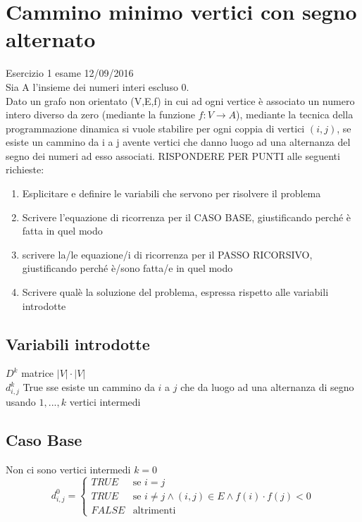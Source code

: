 \documentclass[12pt, a4paper, openany]{book}
\begin{document}
\section{Cammino minimo vertici con segno alternato} Esercizio 1 esame 12/09/2016\\
Sia A l'insieme dei numeri interi escluso 0.\\
Dato un grafo non orientato (V,E,f) in cui ad ogni vertice è associato un numero intero
diverso da zero (mediante la funzione $f: V\rightarrow A$), mediante la tecnica della
programmazione dinamica si vuole stabilire per ogni coppia di vertici $(i,j)$, se esiste un
cammino da i a j avente vertici che danno luogo ad una alternanza del segno dei numeri
ad esso associati. RISPONDERE PER PUNTI alle seguenti richieste:
\begin{enumerate}
	\item Esplicitare e definire le variabili che servono per risolvere il problema
	\item Scrivere l'equazione di ricorrenza per il CASO BASE, giustificando perché è fatta in quel modo
	\item scrivere la/le equazione/i di ricorrenza per il PASSO RICORSIVO, giustificando perché è/sono fatta/e in quel modo
	\item Scrivere qualè la soluzione del problema, espressa rispetto alle variabili introdotte
\end{enumerate}

\subsection*{Variabili introdotte}
$D^k$ matrice $|V|\cdot|V|$
\\$d^k_{i,j}$ True sse esiste un cammino da $i$ a $j$ che da luogo ad una alternanza di segno usando ${1,...,k}$ vertici intermedi

	\subsection*{Caso Base} Non ci sono vertici intermedi $k=0$
	\begin{equation*}
		d^0_{i,j} = \begin{cases}
			TRUE  & \text{se $i=j$}                                                  \\
			TRUE  & \text{se $i\neq j \land (i,j) \in E \land f(i) \cdot f(j) < 0 $} \\
			FALSE & \text{altrimenti}
		\end{cases}
	\end{equation*}
\end{document}
